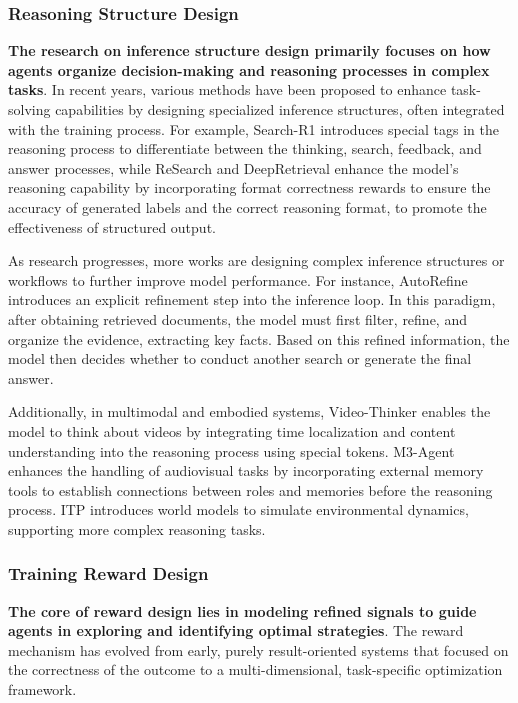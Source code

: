 \subsubsection{Reasoning Structure Design}
\label{sec:reasoning_structure}
\textbf{The research on inference structure design primarily focuses on how agents organize decision-making and reasoning processes in complex tasks}. In recent years, various methods have been proposed to enhance task-solving capabilities by designing specialized inference structures, often integrated with the training process. For example, Search-R1 \cite{Search-r1} introduces special tags in the reasoning process to differentiate between the thinking, search, feedback, and answer processes, while ReSearch \cite{ReSearch_2} and DeepRetrieval \cite{Deepretrieval} enhance the model's reasoning capability by incorporating format correctness rewards to ensure the accuracy of generated labels and the correct reasoning format, to promote the effectiveness of structured output. 

As research progresses, more works are designing complex inference structures or workflows to further improve model performance. For instance, AutoRefine \cite{AutoRefine} introduces an explicit refinement step into the inference loop. In this paradigm, after obtaining retrieved documents, the model must first filter, refine, and organize the evidence, extracting key facts. Based on this refined information, the model then decides whether to conduct another search or generate the final answer.

Additionally, in multimodal and embodied systems, Video-Thinker \cite{Video-Thinker} enables the model to think about videos by integrating time localization and content understanding into the reasoning process using special tokens. M3-Agent \cite{M3-Agent} enhances the handling of audiovisual tasks by incorporating external memory tools to establish connections between roles and memories before the reasoning process. ITP \cite{ITP} introduces world models to simulate environmental dynamics, supporting more complex reasoning tasks.

\subsubsection{Training Reward Design}
\label{sec:reward_shaping}
\textbf{The core of reward design lies in modeling refined signals to guide agents in exploring and identifying optimal strategies}. The reward mechanism has evolved from early, purely result-oriented systems that focused on the correctness of the outcome to a multi-dimensional, task-specific optimization framework.

